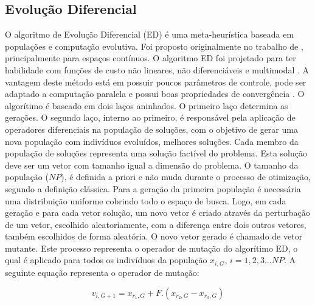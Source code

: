 \documentclass[12pt,A4,A4pt]{article}
\begin{document}


\subsection{Evolução Diferencial}
\label{ed}
\hspace{0.5cm}O algoritmo de Evolução Diferencial (ED) é uma meta-heurística baseada em populações e computação evolutiva. Foi proposto originalmente no trabalho de \cite{Storn1997}, principalmente para espaços contínuos. O algoritmo ED foi projetado para ter habilidade com funções de custo não lineares, não diferenciáveis e multimodal \citep{Storn1997}. A vantagem deste método está em possuir poucos parâmetros de controle, pode ser adaptado a computação paralela e possui boas propriedades de convergência \citep{Storn1997}. O algorítimo é baseado em dois laços aninhados. O primeiro laço determina as gerações. O segundo laço, interno ao primeiro, é responsável pela aplicação de operadores diferenciais na população de soluções, com o objetivo de gerar uma nova população com indivíduos evoluídos, melhores soluções. Cada membro da população de soluções representa uma solução factível do problema. Esta solução deve ser um vetor com tamanho igual a dimensão do problema. O tamanho da população ($NP$), é definida a priori e não muda durante o processo de otimização, segundo a definição clássica. Para a geração da primeira população é necessária uma distribuição uniforme cobrindo todo o espaço de busca. Logo, em cada geração e para cada vetor solução, um novo vetor é criado através da perturbação de um vetor, escolhido aleatoriamente, com a diferença entre dois outros vetores, também escolhidos de forma aleatória. O novo vetor gerado é chamado de vetor mutante. Este processo representa o operador de mutação do algorítimo ED, o qual é aplicado para todos os indivíduos da população $x_{i,G}$, $i = 1,2,3...NP$. A seguinte equação representa o operador de mutação:

\begin{equation}
v_{i,G+1} = x_{r_{1},G} + F . (x_{r_{2},G} - x_{r_{3},G}) \label{trial}
\end{equation}
\end{document}
